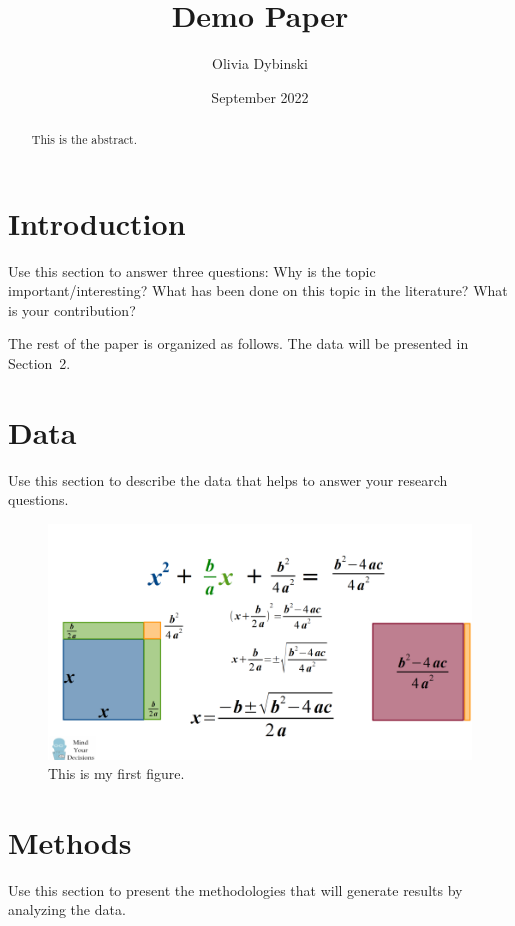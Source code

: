 \documentclass[12pt]{article}
\title{Demo Paper}
\author{Olivia Dybinski\\}
\date{September 2022}
\begin{document}
 \maketitle

 \begin{abstract}
This is the abstract. 
 \end{abstract}


 \section{Introduction} 
 \label{sec:intro}

 Use this section to answer three questions:
 Why is the topic important/interesting?
 What has been done on this topic in the literature?
 What is your contribution?


 The rest of the paper is organized as follows.
 The data will be presented in Section~2.


 \section{Data}
 \label{sec:data}

 Use this section to describe the data that helps to answer your research questions.

 \begin{figure}
    \centering
    \includegraphics[width=\textwidth]{quadraticform.png}
    \caption{This is my first figure.}
    \label{fig:Quadratic Formula}
  \end{figure}

 \section{Methods}
 \label{sec:meth}

 Use this section to present the methodologies that will generate results by analyzing the data.
\end{document}
